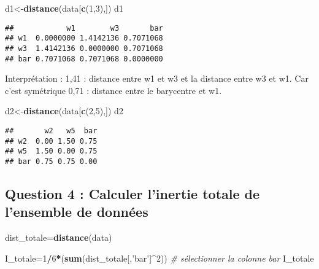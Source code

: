\documentclass[]{article}
\newenvironment{Shaded}{\begin{snugshade}}{\end{snugshade}}
\newcommand{\CommentTok}[1]{\textcolor[rgb]{0.56,0.35,0.01}{\textit{#1}}}
\newcommand{\DecValTok}[1]{\textcolor[rgb]{0.00,0.00,0.81}{#1}}
\newcommand{\KeywordTok}[1]{\textcolor[rgb]{0.13,0.29,0.53}{\textbf{#1}}}
\newcommand{\NormalTok}[1]{#1}
\newcommand{\OperatorTok}[1]{\textcolor[rgb]{0.81,0.36,0.00}{\textbf{#1}}}
\newcommand{\StringTok}[1]{\textcolor[rgb]{0.31,0.60,0.02}{#1}}
\begin{document}
\begin{Shaded}
\begin{Highlighting}[]
\NormalTok{d1<-}\KeywordTok{distance}\NormalTok{(data[}\KeywordTok{c}\NormalTok{(}\DecValTok{1}\NormalTok{,}\DecValTok{3}\NormalTok{),])}
\NormalTok{d1}
\end{Highlighting}
\end{Shaded}

\begin{verbatim}
##            w1        w3       bar
## w1  0.0000000 1.4142136 0.7071068
## w3  1.4142136 0.0000000 0.7071068
## bar 0.7071068 0.7071068 0.0000000
\end{verbatim}

Interprétation : 1,41 : distance entre w1 et w3 et la distance entre w3
et w1. Car c'est symétrique 0,71 : distance entre le barycentre et w1.

\begin{Shaded}
\begin{Highlighting}[]
\NormalTok{d2<-}\KeywordTok{distance}\NormalTok{(data[}\KeywordTok{c}\NormalTok{(}\DecValTok{2}\NormalTok{,}\DecValTok{5}\NormalTok{),])}
\NormalTok{d2}
\end{Highlighting}
\end{Shaded}

\begin{verbatim}
##       w2   w5  bar
## w2  0.00 1.50 0.75
## w5  1.50 0.00 0.75
## bar 0.75 0.75 0.00
\end{verbatim}

\hypertarget{question-4-calculer-linertie-totale-de-lensemble-de-donnuxe9es}{%
\subsection{Question 4 : Calculer l'inertie totale de l'ensemble de
données}\label{question-4-calculer-linertie-totale-de-lensemble-de-donnuxe9es}}

\begin{Shaded}
\begin{Highlighting}[]
\NormalTok{dist_totale=}\KeywordTok{distance}\NormalTok{(data)}

\NormalTok{I_totale=}\DecValTok{1}\OperatorTok{/}\DecValTok{6}\OperatorTok{*}\NormalTok{(}\KeywordTok{sum}\NormalTok{(dist_totale[,}\StringTok{'bar'}\NormalTok{]}\OperatorTok{^}\DecValTok{2}\NormalTok{)) }\CommentTok{# sélectionner la colonne bar}
\NormalTok{I_totale}
\end{Highlighting}
\end{Shaded}
\end{document}
